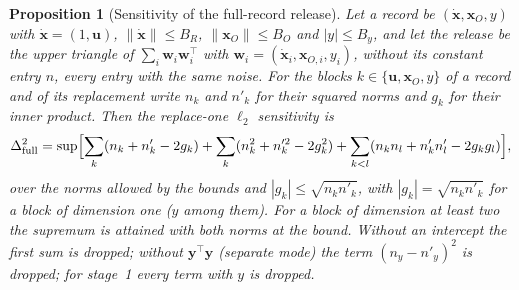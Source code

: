 \documentclass[11pt]{article}
\theoremstyle{definition}
\theoremstyle{plain}
\newtheorem{proposition}{Proposition}[section]
\newcommand{\by}{\mathbf{y}}
\newcommand{\bx}{\mathbf{x}}
\newcommand{\bxd}{\dot{\mathbf{x}}}
\begin{document}
\begin{proposition}[Sensitivity of the full-record release]
\label{prop:sens_full}
Let a record be $(\bxd, \bx_O, y)$ with $\bxd = (1, \mathbf u)$, $\|\bxd\| \le B_R$, $\|\bx_O\| \le B_O$ and $|y| \le B_y$, and let the release be the upper triangle of $\sum_i \mathbf w_i\mathbf w_i^\top$ with $\mathbf w_i = (\bxd_i, \bx_{O,i}, y_i)$, without its constant entry $n$, every entry with the same noise. For the blocks $k \in \{\mathbf u, \bx_O, y\}$ of a record and of its replacement write $n_k$ and $n'_k$ for their squared norms and $g_k$ for their inner product. Then the replace-one $\ell_2$ sensitivity is
\begin{equation}
  \Delta_{\mathrm{full}}^2 = \sup\Bigl[\sum_k (n_k + n'_k - 2g_k) + \sum_k (n_k^2 + n_k'^2 - 2g_k^2) + \sum_{k < l} (n_k n_l + n'_k n'_l - 2g_k g_l)\Bigr],
  \label{eq:sens_full}
\end{equation}
over the norms allowed by the bounds and $|g_k| \le \sqrt{n_k n'_k}$, with $|g_k| = \sqrt{n_k n'_k}$ for a block of dimension one ($y$ among them). For a block of dimension at least two the supremum is attained with both norms at the bound. Without an intercept the first sum is dropped; without $\by^\top\by$ (separate mode) the term $(n_y - n'_y)^2$ is dropped; for stage~1 every term with $y$ is dropped.
\end{proposition}
\end{document}
